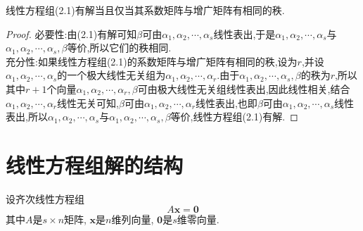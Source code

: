 \begin{theorem}
    线性方程组(2.1)有解当且仅当其系数矩阵与增广矩阵有相同的秩.
\end{theorem}
\begin{proof}
    必要性:由(2.1)有解可知$\beta$可由$\alpha_1, \alpha_2, \cdots, \alpha_s$线性表出,于是$\alpha_1, \alpha_2, \cdots, \alpha_s$与$\alpha_1, \alpha_2, \cdots, \alpha_s, \beta$等价,所以它们的秩相同.\\
    充分性:如果线性方程组(2.1)的系数矩阵与增广矩阵有相同的秩,设为$r$,并设$\alpha_1,\alpha_2,\cdots,\alpha_s$的一个极大线性无关组为$\alpha_1,\alpha_2,\cdots,\alpha_r$.由于$\alpha_1, \alpha_2, \cdots, \alpha_s, \beta$的秩为$r$,所以其中$r+1$个向量$\alpha_1,\alpha_2,\cdots,\alpha_r,\beta$可由极大线性无关组线性表出,因此线性相关,结合$\alpha_1,\alpha_2,\cdots,\alpha_r$线性无关可知,$\beta$可由$\alpha_1, \alpha_2, \cdots, \alpha_r$线性表出,也即$\beta$可由$\alpha_1, \alpha_2, \cdots, \alpha_s$线性表出,所以$\alpha_1, \alpha_2, \cdots, \alpha_s$与$\alpha_1, \alpha_2, \cdots, \alpha_s, \beta$等价,线性方程组(2.1)有解.
\end{proof}

\section{线性方程组解的结构}
设齐次线性方程组
\begin{equation*}
    A\mathbf{x} = \mathbf{0}
\end{equation*}
其中$A$是$s \times n$矩阵, $\mathbf{x}$是$n$维列向量, $\mathbf{0}$是$s$维零向量.